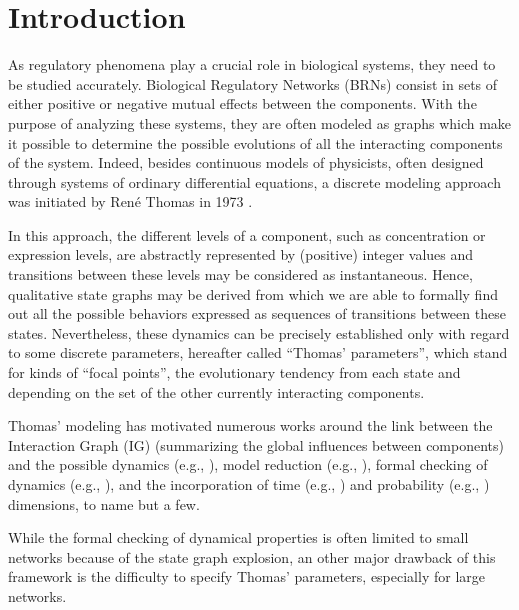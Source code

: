 \section{Introduction}\label{sec:intro}

As regulatory phenomena play a crucial role in biological systems, they need to be studied accurately.
Biological Regulatory Networks (BRNs) consist in sets of either positive or negative mutual effects between the components.
With the purpose of analyzing these systems, they are often modeled as graphs which make it possible to determine the possible evolutions of all the interacting components of the system.
Indeed, besides continuous models of physicists, often designed through systems of ordinary
differential equations, a discrete modeling approach was initiated by René Thomas in 1973
\cite{Thomas73}.

In this approach, the different levels of a component, such as concentration or expression levels, are abstractly represented by (positive) integer values and transitions between these levels may be considered as instantaneous.
Hence, qualitative state graphs may be derived from which we are able to formally find out all the possible behaviors expressed as sequences of transitions between these states.
Nevertheless, these dynamics can be precisely established only with regard to some discrete parameters,
hereafter called ``Thomas' parameters'',
which stand for kinds of ``focal points'', \ie the evolutionary tendency from each state and depending on the set of the other currently interacting components.

Thomas' modeling has motivated numerous works around the link between the Interaction Graph (IG)
(summarizing the global influences between components) and the possible dynamics (e.g.,
\cite{RiCo07,RRT08}),
model reduction (e.g., \cite{Naldi09}), formal checking of dynamics (e.g., \cite{Richard06,Naldi07}), 
and the incorporation of time (e.g., \cite{Siebert06,Ahmad08}) and probability
(e.g., \cite{Twardziok10-CMSB}) dimensions, to name but a few.

While the formal checking of dynamical properties is often limited to small networks because of the
state graph explosion, an other major drawback of this framework is the difficulty to
specify Thomas' parameters, especially for large networks.


